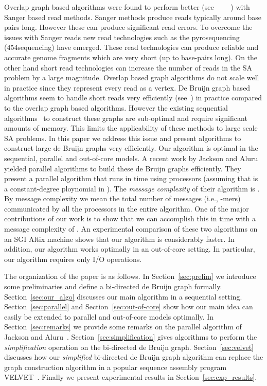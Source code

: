 \documentclass[11pt,conference,twocolumn]{IEEEtran}
\begin{document}
Overlap graph based algorithms were found to perform better 
(see ~\cite{PCAP}~\cite{CELERA}~\cite{ARCHANE}~\cite{PHRAP}) with Sanger based read methods. Sanger
methods produce reads typically around  base pairs long. However these can produce significant
read errors. To overcome the issues with Sanger reads new read technologies such as the 
pyrosequencing (454sequencing) have emerged. These read technologies can produce reliable and 
accurate genome fragments which are very short (up to  base-pairs long). On the other hand short read
technologies can increase the number of reads in the SA problem by a large magnitude. Overlap based
graph algorithms do not scale well in practice since they represent every read as a vertex. De Bruijn
graph based algorithms seem to handle short reads very efficiently (see~\cite{velvet08}) in practice
compared to the overlap graph based algorithms. However the existing sequential algorithms~\cite{velvet08} 
to construct these graphs are sub-optimal and require significant amounts of memory. This limits the
applicability of these methods to large scale SA problems. In this paper we address this issue and present
algorithms to construct large de Bruijn graphs very efficiently. Our algorithm is optimal in the sequential,
parallel and out-of-core models.  A recent work by Jackson and Aluru~\cite{par_bidirected_graph} yielded
parallel algorithms to build these de Bruijn graphs efficiently. They present a parallel algorithm 
that runs in  time using  processors (assuming that  is a constant-degree ploynomial in ).
The {\em message complexity} of their algorithm is . By message complexity we mean
the total number of messages (i.e., -mers) communicated by all the processors in the entire algorithm.
One of the major contributions of our
work is to show that we can accomplish this in  time with a message complexity of . An experimental
comparison of these two algorithms on an SGI Altix machine shows that our algorithm is considerably faster.
In addition, our algorithm works optimally in an out-of-core setting. In particular, our algorithm requires only
 I/O operations.

The organization of the paper is as follows. In Section~\ref{sec:prelim} we introduce some preliminaries
and define a bi-directed de Bruijn graph formally. Section~\ref{sec:our_algo} discusses our main algorithm
in a sequential setting. Section~\ref{sec:parallel} and Section~\ref{sec:out-of-core} show how our main 
idea can easily be extended to parallel and out-of-core models optimally. In Section~\ref{sec:remarks} 
we provide some remarks on the parallel algorithm of Jackson and Aluru~\cite{par_bidirected_graph}.
Section~\ref{sec:simplification} gives algorithms to perform the {\em simplification}
operation on the bi-directed de Bruijn graph. Section~\ref{sec:velvet} discusses how our {\em simplified}
bi-directed de Bruijn graph algorithm can replace the graph construction algorithm in a popular sequence
assembly program VELVET~\cite{velvet08}. Finally we present experimental results in Section~\ref{sec:exp_results}.
\end{document}
